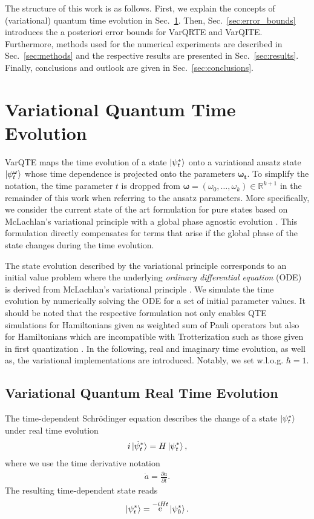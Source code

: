 \documentclass[twocolumn, aps, pra, superscriptaddress]{revtex4-1}
\DeclareMathOperator{\ee}{e}
\begin{document}
The structure of this work is as follows. First, we explain the concepts of (variational) quantum time evolution in Sec.~\ref{sec:VarQTE}. Then, Sec.~\ref{sec:error_bounds} introduces the a posteriori error bounds for VarQRTE and VarQITE. Furthermore, methods used for the numerical experiments are described in Sec.~\ref{sec:methods} and the respective results are presented in Sec.~\ref{sec:results}. Finally, conclusions and outlook are given in Sec.~\ref{sec:conclusions}.


\section{Variational Quantum Time Evolution}
\label{sec:VarQTE}

VarQTE maps the time evolution of a state $\ket{\psi^*_t} $ onto a variational ansatz state $\ket{\psi^{\omega}_t}$ whose time dependence is projected onto the parameters $\bm{\omega_t}$. To simplify the notation, the time parameter $t$ is dropped from $\bm{\omega}=(\omega_0, \ldots, \omega_k)\in\mathbb{R}^{k+1}$ in the remainder of this work when referring to the ansatz parameters.
More specifically, we consider the current state of the art formulation for pure states based on McLachlan's variational principle \cite{McLachlan64} with a global phase agnostic evolution \cite{Simon18TheoryVarQSim}. 
This formulation directly compensates for terms that arise if the global phase of the state changes during the time evolution.

The state evolution described by the variational principle corresponds to an initial value problem where the underlying \textit{ordinary differential equation} (ODE)~\cite{Tahir-Kheli2018ODEs} is derived from McLachlan's variational principle \cite{McLachlan64}.
We simulate the time evolution by numerically solving the ODE for a set of initial parameter values. It should be noted that the respective formulation not only enables QTE simulations for Hamiltonians given as weighted sum of Pauli operators but also for Hamiltonians which are incompatible with Trotterization such as those given in first quantization \cite{QAlgGridVarQRTE}. 
In the following, real and imaginary time evolution, as well as, the variational implementations are introduced. Notably, we set w.l.o.g. $\hbar=1$. 

\subsection{Variational Quantum Real Time Evolution}
\label{sec:varqrte}
The time-dependent Schr\"odinger equation describes the change of a state $\ket{\psi^*_t}$ under real time evolution 
\begin{align}
    i\ket{\dot\psi^*_t}= H\ket{\psi^*_t},
\end{align}
where we use the time derivative notation
\begin{align}
    \dot a = \frac{\partial a}{\partial t}.
\end{align}
The resulting time-dependent state reads
\begin{align}
\label{eq:VarQRTE_state}
    \ket{\psi^*_t} = \ee^{-iHt}\ket{\psi^*_0}.
\end{align}
\end{document}
